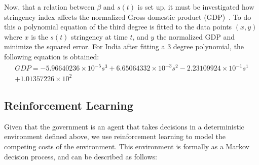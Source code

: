 \documentclass[tikz,fleqn,12pt]{wlscirep}
\begin{document}
Now, that a relation between $\beta$ and $s(t)$ is set up, it must be investigated how stringency index affects the normalized Gross domestic product (GDP)~\cite{OECDNormalizedGDP,OECDNormalizedGDP2}. To do this a polynomial equation of the third degree is fitted to the data points $(x, y)$ where $x$ is the $s(t)$ stringency at time $t$, and $y$ the normalized GDP and minimize the squared error. For India after fitting a 3 degree polynomial, the following equation is obtained:
\begin{equation}
    \begin{split}
      GDP = -5.96640236 \times 10^{-5} s^{3} + 6.65064332 \times 10^{-3} s^{2} - 2.23109924 \times 10^{-1} s^{1} \\
    + 1.01357226 \times 10^{2}
    \end{split}
    \label{eq:gdp_modelled_with_stringency_IND}
\end{equation}

\subsection{Reinforcement Learning}
Given that the government is an agent that takes decisions in a deterministic environment defined above, we use reinforcement learning to model the competing costs of the environment. This environment is formally as a Markov decision process, and can be described as follows:
\end{document}

